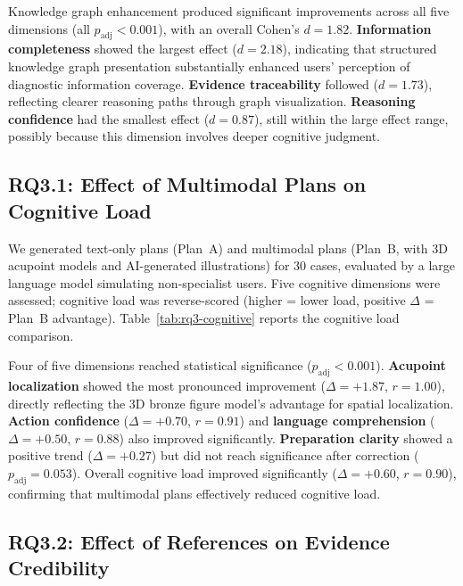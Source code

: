 

Knowledge graph enhancement produced significant improvements across all five dimensions (all $p_{\mathrm{adj}}<0.001$), with an overall Cohen's $d=1.82$.
\textbf{Information completeness} showed the largest effect ($d=2.18$), indicating that structured knowledge graph presentation substantially enhanced users' perception of diagnostic information coverage.
\textbf{Evidence traceability} followed ($d=1.73$), reflecting clearer reasoning paths through graph visualization.
\textbf{Reasoning confidence} had the smallest effect ($d=0.87$), still within the large effect range, possibly because this dimension involves deeper cognitive judgment.

\subsection{RQ3.1: Effect of Multimodal Plans on Cognitive Load}\label{sec:eval-rq3a-cognitive}

We generated text-only plans (Plan~A) and multimodal plans (Plan~B, with 3D acupoint models and AI-generated illustrations) for 30 cases, evaluated by a large language model simulating non-specialist users.
Five cognitive dimensions were assessed; cognitive load was reverse-scored (higher = lower load, positive $\Delta$ = Plan~B advantage).
Table~\ref{tab:rq3-cognitive} reports the cognitive load comparison.



Four of five dimensions reached statistical significance ($p_{\mathrm{adj}}<0.001$).
\textbf{Acupoint localization} showed the most pronounced improvement ($\Delta=+1.87$, $r=1.00$), directly reflecting the 3D bronze figure model's advantage for spatial localization.
\textbf{Action confidence} ($\Delta=+0.70$, $r=0.91$) and \textbf{language comprehension} ($\Delta=+0.50$, $r=0.88$) also improved significantly.
\textbf{Preparation clarity} showed a positive trend ($\Delta=+0.27$) but did not reach significance after correction ($p_{\mathrm{adj}}=0.053$).
Overall cognitive load improved significantly ($\Delta=+0.60$, $r=0.90$), confirming that multimodal plans effectively reduced cognitive load.

\subsection{RQ3.2: Effect of References on Evidence Credibility}\label{sec:eval-rq3c-refs}

